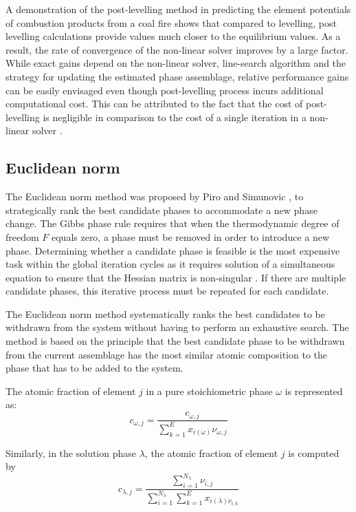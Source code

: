 		A demonstration of the post-levelling method in predicting the element potentials of combustion products from a coal fire shows that compared to levelling, post levelling calculations provide values much closer to the equilibrium values. As a result, the rate of convergence of the non-linear solver improves by a large factor.  While exact gains depend on the non-linear solver, line-search algorithm and the strategy for updating the estimated phase assemblage, relative performance gains can be easily envisaged even though post-levelling process incurs additional computational cost. This can be attributed to the fact that the cost of post-levelling is negligible in comparison to the cost of a single iteration in a non-linear solver \cite{Piro12a}.

	\subsection{Euclidean norm} \label{sec:Euclidean}
	The Euclidean norm method was proposed by Piro and Simunovic \cite{Piro12a}, to strategically rank the best candidate phases to accommodate a new phase change. The Gibbs phase rule requires that when the thermodynamic degree of freedom $F$ equals zero, a phase must be removed in order to introduce a new phase. Determining whether a candidate phase is feasible is the most expensive task within the global iteration cycles as it requires solution of a simultaneous equation to ensure that the Hessian matrix is non-singular \cite{Piro12a}. If there are multiple candidate phases, this iterative process must be repeated for each candidate.

	The Euclidean norm method systematically ranks the best candidates to be withdrawn from the system without having to perform an exhaustive search. The method is based on the principle that the best candidate phase to be withdrawn from the current assemblage has the most similar atomic composition to the phase that has to be added to the system.

	The atomic fraction of element $j$ in a pure stoichiometric phase $\omega$ is represented as:
	\begin{equation}
		c_{\omega,j} = \frac{c_{\omega,j}}{\sum_{k=1}^{E} x_{i(\omega)}\nu_{\omega,j}}
	\end{equation}

	Similarly, in the solution phase  $\lambda$, the atomic fraction of element $j$ is computed by
	\begin{equation}
		c_{\lambda,j} = \frac{\sum_{i=1}^{N_{\lambda}} \nu_{i,j}}{\sum_{i=1}^{N_{\lambda}} \sum_{k=1}^{E} x_{i(\lambda) \nu_{i,k}}}
	\end{equation}

